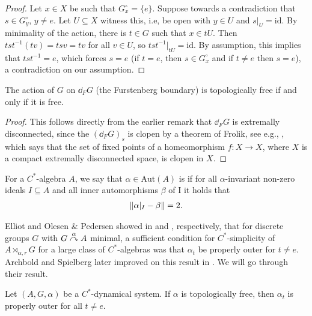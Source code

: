 \begin{proof}
	Let $x \in X$ be such that $G_x^\circ = \{e\}$. Suppose towards a contradiction that $s \in G_y^\circ$, $y \neq e$. Let $U \subseteq X$ witness this, i.e, be open with $y \in U$ and $s|_U=\mathrm{id}$. By minimality of the action, there is $t \in G$ such that $x \in tU$. Then $tst^{-1}(tv) =  tsv = tv$ for all $v \in U$, so $tst^{-1}|_{tU}=  \mathrm{id}$. By assumption, this implies that $tst^{-1} = e$, which forces $s = e$ (if $t = e$, then $s \in G_x^\circ$ and if $t \neq e$ then $s = e$), a contradiction on our assumption.
\end{proof}
\begin{corollary}
	The action of $G$ on $\dd_F G$ (the Furstenberg boundary) is topologically free if and only if it is free.
\end{corollary}
\begin{proof}
	This follows directly from the earlier remark that $\dd_F G$ is extremally disconnected, since the $(\dd_F G)_s$ is clopen by a theorem of Frolik, see e.g., \cite[Theorem 3.1]{frolik1971maps}, which says that the set of fixed points of a homeomorphism $f \colon X \to X$, where $X$ is a compact extremally disconnected space, is clopen in $X$.
\end{proof}
\begin{definition}
	For a $C^*$-algebra $A$, we say that $\alpha \in \mathrm{Aut}(A)$ is  if for all $\alpha$-invariant non-zero ideals $I \subseteq A$ and all inner automorphisms $\beta$ of I it holds that
	\begin{align*}
		\left\lVert \alpha|_I - \beta \right\rVert = 2.
	\end{align*}
\end{definition}
Elliot and Olesen \& Pedersen showed in \cite[Theorem 3.2]{elliott1980some} and \cite[Theorem 7.2]{olesenpedersen3}, respectively, that for discrete groups $G$ with $G \stackrel{\alpha}{\curvearrowright} A$ minimal, a sufficient condition for $C^*$-simplicity of $A \rtimes_{\alpha,r} G$ for a large class of $C^*$-algebras was that $\alpha_t$ be properly outer for $t \neq e$. Archbold and Spielberg later improved on this result in \cite{archbold1994topologically}. We will go through their result. 
\begin{proposition}
	Let $(A,G,\alpha)$ be a $C^*$-dynamical system. If $\alpha$ is topologically free, then $\alpha_t$ is properly outer for all $t \neq e$.
\end{proposition}
